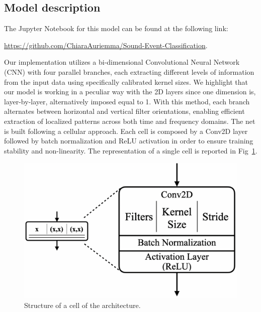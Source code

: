 \documentclass{article}
\begin{document}
\begin{sloppy}
\subsection{Model description}
\label{sec:model_description}
The Jupyter Notebook for this model can be found at the following link:

\url{https://github.com/ChiaraAuriemma/Sound-Event-Classification}.


Our implementation utilizes a bi-dimensional Convolutional Neural Network (CNN)
with four parallel branches, each extracting different levels of information from the
input data using specifically calibrated kernel sizes. 
We highlight that our model is working in a peculiar way with the 2D layers since one dimension is, layer-by-layer, alternatively
imposed equal to 1. With this method, each branch alternates between horizontal and vertical filter orientations,
enabling efficient extraction of localized patterns across both time and frequency domains.
The net is built following a cellular approach. Each cell is composed by a Conv2D layer followed by batch normalization and
ReLU activation in order to ensure training stability and non-linearity. The representation of a single cell is reported in Fig~\ref{fig:simple_cell}.
\begin{figure}[ht]
  \centering
  \centerline{\includegraphics[width=\columnwidth]{simple_cell.png}}
  \caption{Structure of a cell of the architecture.}
  \label{fig:simple_cell}
\end{figure}


\end{sloppy}
\end{document}
